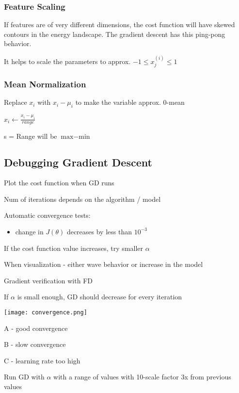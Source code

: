 \subsubsection{Feature Scaling}

If features are of very different dimensions, the cost function will have skewed contours in the energy landscape. The gradient descent has this ping-pong behavior.  

It helps to scale the parameters to approx. $-1 \le x_j^{(i)}\le 1$

\subsubsection{Mean Normalization}

Replace $x_i$ with $x_i - \mu_i$ to make the variable approx. 0-mean

$x_i \leftarrow \frac{x_i-\mu_i}{range}$

s = Range will be $\text{max}-\text{min}$

\subsection{Debugging Gradient Descent}

Plot the cost function when GD runs

Num of iterations depends on the algorithm / model

Automatic convergence tests:

\begin{itemize}
\item change in $J(\theta)$ decreases by less than $10^{-3}$
\end{itemize}

If the cost function value increases, try smaller $\alpha$

When visualization - either wave behavior or increase in the model

Gradient verification with FD

If $\alpha$ is small enough, GD should decrease for every iteration

\texttt{[image: convergence.png]}

A - good convergence

B - slow convergence

C - learning rate too high

Run GD with $\alpha$ with a range of values with 10-scale factor  3x from previous values

